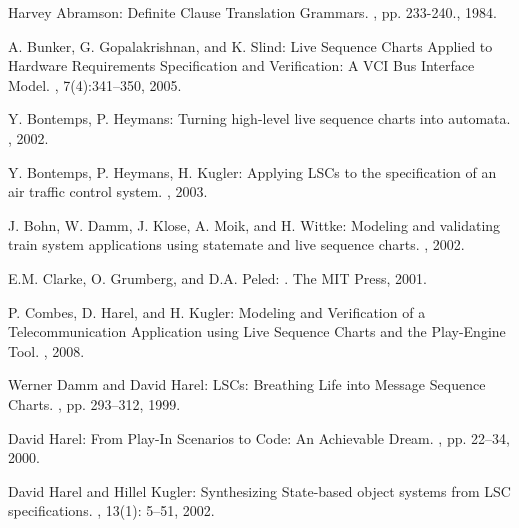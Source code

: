 \documentclass[]{llncs}
\begin{document}

\begin{thebibliography}{10}


Harvey Abramson:
\newblock Definite Clause Translation Grammars.
, pp. 233-240., 1984.

A. Bunker, G. Gopalakrishnan, and K. Slind:
\newblock Live Sequence Charts Applied to Hardware Requirements Specification and Verification:
A VCI Bus Interface Model.
, 7(4):341--350, 2005.


Y. Bontemps, P. Heymans:
\newblock Turning high-level live sequence charts into automata.
, 2002.

Y. Bontemps, P. Heymans, H. Kugler:
\newblock Applying LSCs to the specification of an air traffic control system.
,
2003.

J. Bohn, W. Damm, J. Klose, A. Moik, and H. Wittke:
\newblock Modeling and validating train system applications using statemate
and live sequence charts.
,
2002.



E.M. Clarke, O. Grumberg, and D.A. Peled:
.
\newblock The MIT Press, 2001.

P. Combes, D. Harel, and H. Kugler:
\newblock Modeling and Verification of a Telecommunication Application using
Live Sequence Charts and the Play-Engine Tool.
,
2008.


Werner Damm and David Harel:
\newblock LSCs: Breathing Life into Message Sequence Charts.
,
pp. 293--312, 1999.



David Harel:
\newblock From Play-In Scenarios to Code: An Achievable Dream.
,
pp. 22--34, 2000.

David Harel and Hillel Kugler:
\newblock Synthesizing State-based object systems from LSC specifications.
,
13(1): 5--51, 2002.


\end{thebibliography}
\end{document}
